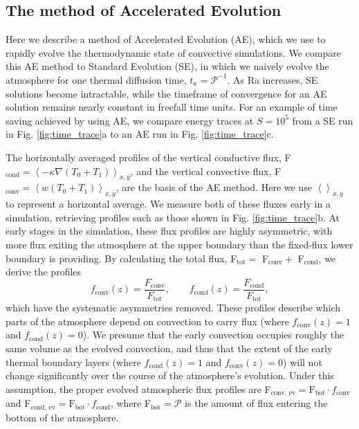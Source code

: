 \documentclass[aps, pre, onecolumn, nofootinbib, notitlepage, groupedaddress, amsfonts, amssymb, amsmath, longbibliography]{revtex4-1}
\newcommand{\angles}[1]{\ensuremath{\left\langle #1 \right\rangle}}
\newcommand{\grad}{\ensuremath{\nabla}}
\begin{document}
\subsection{The method of Accelerated Evolution}
\label{subsection:ae}
Here we describe a method of Accelerated Evolution (AE), which we use 
to rapidly evolve the thermodynamic state of convective simulations.  
We compare this AE method to Standard Evolution
(SE), in which we naively evolve the atmosphere for one thermal diffusion time,
$t_\kappa = \mathcal{P}^{-1}$. As Ra increases, SE solutions become intractable, 
while the timeframe of convergence for an AE solution remains nearly constant
in freefall time units.
For an example of time saving achieved by using AE, we compare
energy traces at $S = 10^5$ from a SE run in Fig. \ref{fig:time_trace}a to an AE run
in Fig. \ref{fig:time_trace}c.

The horizontally averaged profiles of the vertical conductive flux, 
F$_{\text{cond}} = \angles{-\kappa\grad(T_0 + T_1)}_{x,y}$, and the vertical convective flux,
F$_{\text{conv}} = \angles{w(T_0 + T_1)}_{x,y}$, are the basis of the AE method.
Here we use $\angles{}_{x,y}$ to represent a horizontal average. We measure
both of these fluxes early in a simulation, retrieving profiles such as
those shown in Fig. \ref{fig:time_trace}b.
At early stages in the simulation, these flux profiles are highly asymmetric,
with more flux exiting the atmosphere at the upper boundary than 
the fixed-flux lower boundary is providing.
By calculating the total flux,
F$_{\text{tot}} =$ F$_{\text{conv}} +$ F$_{\text{cond}}$, we derive the profiles
\begin{equation}
f_{\text{conv}}(z) = \frac{F_{\text{conv}}}{F_{\text{tot}}},\qquad
f_{\text{cond}}(z) = \frac{F_{\text{cond}}}{F_{\text{tot}}},
\label{eqn:bvp_ratios}
\end{equation}
which have the systematic asymmetries removed. These profiles describe which
parts of the atmosphere depend on convection to carry flux (where $f_{\text{conv}}(z) = 1$
and $f_{\text{cond}}(z) = 0$).
We presume that the early convection occupies roughly the same volume as the evolved
convection, and thus that the extent of the early thermal boundary layers 
(where $f_{\text{cond}}(z) = 1$ and $f_{\text{conv}}(z) = 0$) 
will not change significantly over the course of the atmosphere's evolution.
Under this assumption, the proper evolved atmospheric flux profiles
are F$_{\text{conv, ev}} = \text{F}_{\text{bot}}\cdot f_{\text{conv}}$
and F$_{\text{cond, ev}} = \text{F}_{\text{bot}}\cdot f_{\text{cond}}$,
where F$_{\text{bot}} = \mathcal{P}$ is the amount of flux entering the
bottom of the atmosphere.
\end{document}
